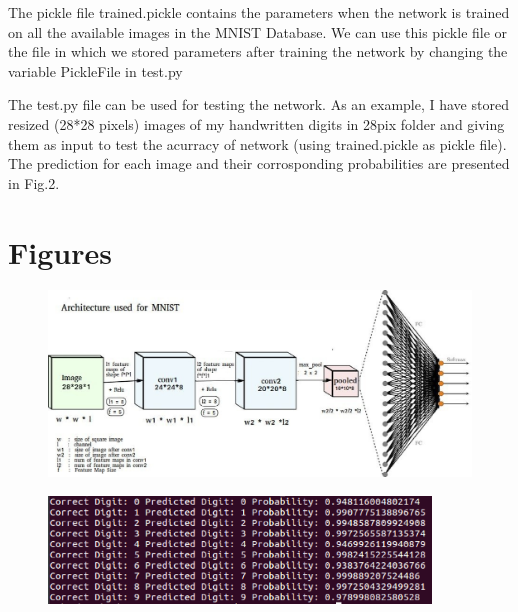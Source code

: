 \documentclass[journal,12pt,twocolumn]{IEEEtran}
\begin{document}
The pickle file trained.pickle contains the parameters when the network is trained on all the available images in the MNIST Database. We can use this pickle file or the file in which we stored parameters after training the network by changing the variable PickleFile in test.py

The test.py file can be used for testing the network. As an example, I have stored resized (28*28 pixels) images of my handwritten digits in 28pix folder and giving them as input to test the acurracy of network (using trained.pickle as pickle file). The prediction for each image and their corrosponding probabilities are presented in Fig.2. 

\section{Figures}
\begin{figure}[!ht]
\begin{center}
\includegraphics[width=6.0in,angle=90]{./figs/archi_mnist.eps}
\end{center}
\caption{}
\label{fig:cnn_archi}
\end{figure}

\begin{figure}[!h]
\begin{center}
\includegraphics[width=4.0in]{./figs/test_result.eps}
\end{center}
\caption{}
\label{fig:results}
\end{figure}
\end{document}
